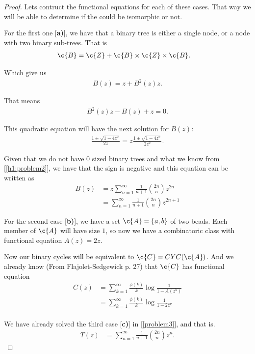\begin{proof}
	Lets contruct the functional equations for each of these cases. That way we will be able to determine if the could be
	isomorphic or not.
	
	For the first one [\textbf{a)}], we have that a binary tree is either a single node, or a node with two binary sub-trees. That is
	\begin{align}
			\c{B}	&=	\c{Z} + \c{B} \times \c{Z} \times \c{B}.
	\end{align}
	
	Which give us
	\begin{align}
			B(z) = z + B^2(z) z.
	\end{align}
	
	That means
	\begin{align}
			B^2(z) z - B(z) + z = 0. 
	\end{align}
	
	This quadratic equation will have the next solution for $B(z)$:
	\begin{align}
			\frac{1 \pm \sqrt{1 - 4 z^2}}{2z} = z \frac{1 \pm \sqrt{1 - 4 z^2}}{2z^2}.
	\end{align}
	
	Given that we do not have $0$ sized binary trees and what we know from [\ref{h1:problem2}], we have that the sign is negative and this equation can be written as
	\begin{align}
			B(z) 	&= z \sum_{n=1}^\infty \frac{1}{n+1}\binom{2n}{n}z^{2n}	\\
						&= \sum_{n=1}^\infty \frac{1}{n+1}\binom{2n}{n}z^{2n + 1}
	\end{align}
	
	For the second case [\textbf{b)}], we have a set $\c{A} = \{a, b\}$ of two beads. Each member of $\c{A}$ will have size $1$, so
    now we have a combinatoric class with functional equation $A(z) = 2z$.\pn
    
    Now our binary cycles will be equivalent to $\c{C} = CYC(\c{A})$. And we already know (From Flajolet-Sedgewick p. 27) that
    $\c{C}$ has functional equation
    \begin{align}
        C(z)    &= \sum_{k = 1}^\infty \frac{\phi(k)}{k} \log \frac{1}{1 - A(z^k)}   \\
                &= \sum_{k = 1}^\infty \frac{\phi(k)}{k} \log \frac{1}{1 - 2z^k}     \\  
    \end{align}
    
    We have already solved the third case [\textbf{c)}] in [\ref{problem3}], and that is.
    \begin{align}
        T(z)    &=  \sum_{n=1}^{\infty} \frac{1}{n+1} \binom{2n}{n} z^n. 
    \end{align}
    

\end{proof}
